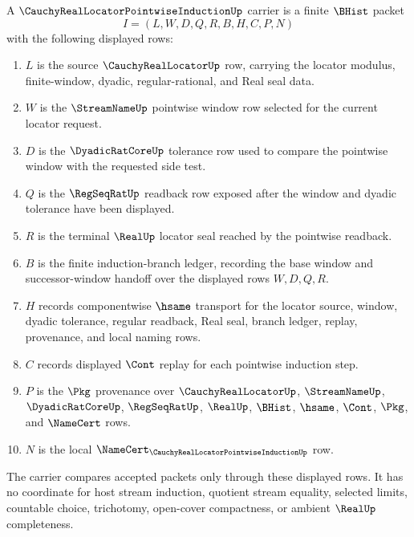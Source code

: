 \begin{definition}
\label{def:cauchy-real-locator-pointwise-induction-carrier}
A $\CauchyRealLocatorPointwiseInductionUp$ carrier is a finite $\BHist$ packet
$$
I=(L,W,D,Q,R,B,H,C,P,N)
$$
with the following displayed rows:
\begin{enumerate}
\item $L$ is the source $\CauchyRealLocatorUp$ row, carrying the locator
modulus, finite-window, dyadic, regular-rational, and Real seal data.
\item $W$ is the $\StreamNameUp$ pointwise window row selected for the current
locator request.
\item $D$ is the $\DyadicRatCoreUp$ tolerance row used to compare the pointwise
window with the requested side test.
\item $Q$ is the $\RegSeqRatUp$ readback row exposed after the window and
dyadic tolerance have been displayed.
\item $R$ is the terminal $\RealUp$ locator seal reached by the pointwise
readback.
\item $B$ is the finite induction-branch ledger, recording the base window and
successor-window handoff over the displayed rows $W,D,Q,R$.
\item $H$ records componentwise $\hsame$ transport for the locator source,
window, dyadic tolerance, regular readback, Real seal, branch ledger, replay,
provenance, and local naming rows.
\item $C$ records displayed $\Cont$ replay for each pointwise induction step.
\item $P$ is the $\Pkg$ provenance over $\CauchyRealLocatorUp$,
$\StreamNameUp$, $\DyadicRatCoreUp$, $\RegSeqRatUp$, $\RealUp$, $\BHist$,
$\hsame$, $\Cont$, $\Pkg$, and $\NameCert$ rows.
\item $N$ is the local
$\NameCert_{\CauchyRealLocatorPointwiseInductionUp}$ row.
\end{enumerate}
The carrier compares accepted packets only through these displayed rows. It
has no coordinate for host stream induction, quotient stream equality, selected
limits, countable choice, trichotomy, open-cover compactness, or ambient
$\RealUp$ completeness.
\end{definition}


